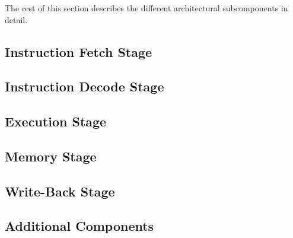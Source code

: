The rest of this section describes the different architectural subcomponents in detail.

\subsection{Instruction Fetch Stage}
    

\subsection{Instruction Decode Stage}
    

\subsection{Execution Stage}
    

\subsection{Memory Stage}
    

\subsection{Write-Back Stage}
    

\subsection{Additional Components}
    

